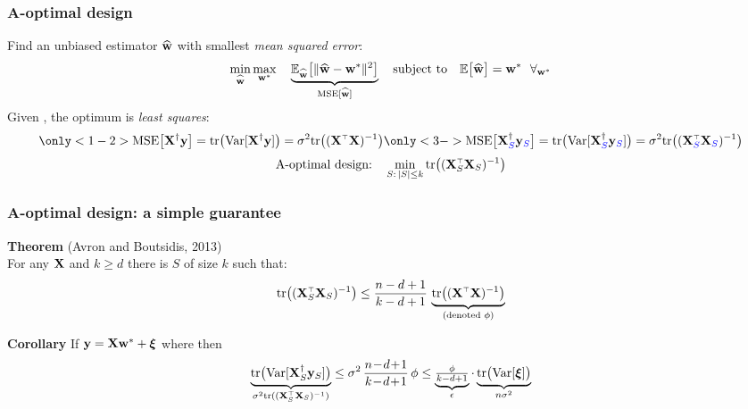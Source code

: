 \documentclass{beamer}
\begin{document}
\begin{frame}
  \frametitle{A-optimal design}
  Find an unbiased estimator $\widehat{\mathbf w}$ with smallest
  \textit{mean squared error}:
  \begin{align*}
    \min_{\widehat{\mathbf w}}\max_{\mathbf w^*}\quad
    \underbrace{\mathbb E_{\widehat{\mathbf w}}\big[\|\widehat{\mathbf w}-\mathbf w^*\|^2\big]}_{\mathrm{MSE}[\widehat{\mathbf w}]}\quad\text{subject
    to}\quad\mathbb E\big[\widehat{\mathbf w}\big]=\mathbf w^*\ \ \forall_{\mathbf w^*}
  \end{align*}
  \pause
Given , the optimum is \textit{least squares}: 
  \begin{align*}
    \only<1-2>{\MSE{\X^\dagger\y}=\tr\big(\Var[\X^\dagger\y]\big)=\sigma^2\tr\big((\X^\top\X)^{-1}\big)}
    \only<3->{\MSE{\X^\dagger_{\Blue{S}}\y_{\Blue{S}}} = \tr\big(\Var[\X^\dagger_{\Blue{S}}\y_{\Blue{S}}]\big)=\sigma^2\tr\big((\X^\top_{\Blue{S}}\X_{\Blue{S}})^{-1}\big)}
  \end{align*}
  \pause\pause
  \vspace{-3mm}
  \begin{align*}
    \text{A-optimal design:}\quad \min_{S:\,|S|\leq k}\tr\big((\X_S^\top\X_S)^{-1}\big)
  \end{align*}
  \pause
  \vspace{4mm}
  
\end{frame}

\begin{frame}
  \frametitle{A-optimal design: a simple guarantee}
  \textbf{Theorem} (Avron and Boutsidis, 2013)\\
  For any $\mathbf X$ and $k\geq d$   there is $S$ of size $k$ such that:
  \begin{align*}
\tr\big((\X_S^\top\X_S)^{-1}\big)\leq
    \frac{n-d+1}{k-d+1}\,\underbrace{\tr\big((\X^\top\X)^{-1}\big)}_{\text{(denoted
    $\phi$)}}
  \end{align*}
  \pause
  
  \textbf{Corollary} If $\mathbf y = \mathbf X\mathbf w^*+\boldsymbol\xi$ where
   then
  \begin{align*}
    \underbrace{\tr\big(\Var[\X_S^\dagger\y_S]\big)}_{\sigma^2 \tr((\X_S^\top\X_S)^{-1})} %
\leq \sigma^2\,\frac{n\!-\!d\!+\!1}{k\!-\!d\!+\!1}\,\phi
\leq \underbrace{\tfrac{\phi}{k-d+1}}_{\epsilon}\cdot\underbrace{\tr\big(\Var[\xib]\big)}_{n\sigma^2}
  \end{align*}
  \pause
\begin{center}\end{center}
\pause
\end{frame}
\end{document}
